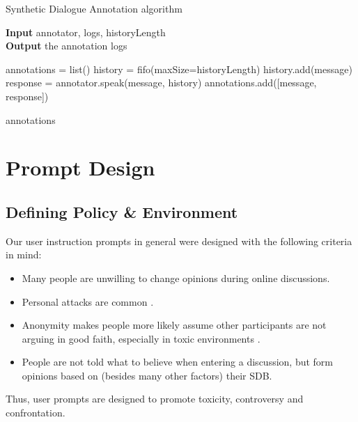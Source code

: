 \begin{algorithm}
	\caption{Synthetic Dialogue Annotation algorithm} 
	\label{al::dialogue-annotation}
	\hspace*{\algorithmicindent} \textbf{Input} annotator, logs, historyLength\\
	\hspace*{\algorithmicindent} \textbf{Output} the annotation logs
	\begin{algorithmic}[1]	
		\State annotations = list()
		\State history = fifo(maxSize=historyLength)
		\State 
			\State history.add(message)
			\State response = annotator.speak(message, history)
			\State annotations.add([message, response])
		\EndFor
		
		\State \Return annotations
	\end{algorithmic} 
\end{algorithm}


\section{Prompt Design}
\label{sec:system:design-prompt}

\subsection{Defining Policy \& Environment}

Our user instruction prompts in general were designed with the following criteria in mind:

\begin{itemize}
	\item Many people are unwilling to change opinions during online discussions.
	
	\item Personal attacks are common \cite{dekock2022disagree}.
	
	\item Anonymity makes people more likely assume other participants are not arguing in good faith, especially in toxic environments \cite{Avalle2024PersistentIP}.
	
	\item People are not told what to believe when entering a discussion, but form opinions based on (besides many other factors) their SDB.  %
	
\end{itemize}

Thus, user prompts are designed to promote toxicity, controversy and confrontation.

